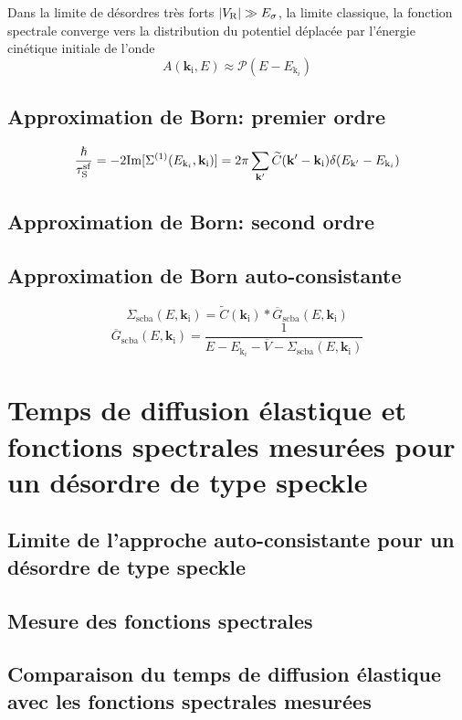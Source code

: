 Dans la limite de désordres très forts $|V_{\mathrm{R}}|\gg E_{\sigma}$, la limite classique, la fonction spectrale converge vers la distribution du potentiel déplacée par l'énergie cinétique initiale de l'onde
\begin{equation}
A(\mathbf{k}_{\mathrm{i}},E)\approx \mathcal{P}(E-E_{\mathrm{k}_i})
\end{equation}


\subsection{Approximation de Born: premier ordre}
\begin{equation}
\frac{\hslash}{\tau_{\mathrm{S}}^{\mathrm{sf}}}=-2 \mathrm{Im}[\Sigma^{(1)}(E_{\mathrm{k}_i},\mathbf{k}_{\mathrm{i}})]=2\pi \sum_{\mathbf{k}'}{\widetilde{C}(\mathbf{k}'-\mathbf{k}_{\mathrm{i}}) \delta(E_{\mathrm{k}'}-E_{\mathrm{k}_i})}
\end{equation}
\subsection{Approximation de Born: second ordre}
\subsection{Approximation de Born auto-consistante}
\begin{equation}
\Sigma_{\mathrm{scba}}(E,\mathbf{k}_{\mathrm{i}})=\widetilde{C}(\mathbf{k}_{\mathrm{i}})\ast \overline{G}_{\mathrm{scba}}(E,\mathbf{k}_{\mathrm{i}})
\end{equation}
\begin{equation}
\overline{G}_{\mathrm{scba}}(E,\mathbf{k}_{\mathrm{i}}) = \frac{1}{E-E_{\mathrm{k}_i} - \overline{V} - \Sigma_{\mathrm{scba}}(E,\mathbf{k}_{\mathrm{i}})}
\end{equation}

\section{Temps de diffusion élastique et fonctions spectrales mesurées pour un désordre de type speckle}
\subsection{Limite de l'approche auto-consistante pour un désordre de type speckle}
\subsection{Mesure des fonctions spectrales}
\subsection{Comparaison du temps de diffusion élastique avec les fonctions spectrales mesurées}

